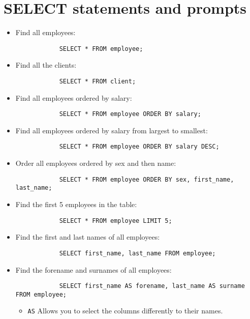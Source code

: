\section{SELECT statements and prompts}
\begin{itemize}
    \item Find all employees:
        \begin{verbatim}
            SELECT * FROM employee;
        \end{verbatim}
    
    \item Find all the clients:
        \begin{verbatim}
            SELECT * FROM client;
        \end{verbatim}
    
    \item Find all employees ordered by salary:
        \begin{verbatim}
            SELECT * FROM employee ORDER BY salary; 
        \end{verbatim}
    
    \item Find all employees ordered by salary from largest to smallest:
        \begin{verbatim}
            SELECT * FROM employee ORDER BY salary DESC;
        \end{verbatim}
    
    \item Order all employees ordered by sex and then name:
        \begin{verbatim}
            SELECT * FROM employee ORDER BY sex, first_name, last_name; 
        \end{verbatim}
    
    \item Find the first 5 employees in the table:
        \begin{verbatim}
            SELECT * FROM employee LIMIT 5;
        \end{verbatim}
    
    \item Find the first and last names of all employees:
        \begin{verbatim}
            SELECT first_name, last_name FROM employee;
        \end{verbatim}
    
    \item  Find the forename and surnames of all employees:
        \begin{verbatim}
            SELECT first_name AS forename, last_name AS surname FROM employee;
        \end{verbatim}
        \begin{itemize}
            \item \texttt{AS} Allows you to select the columns differently to their names.
        \end{itemize}
    

\end{itemize}
